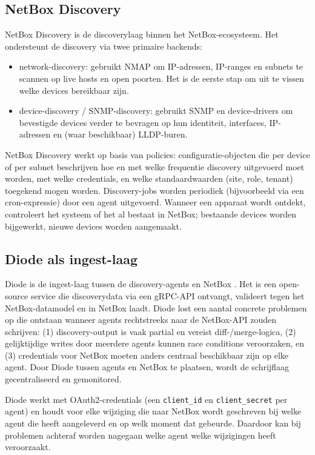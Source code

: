 \subsection{NetBox Discovery}

NetBox Discovery is de discoverylaag binnen het NetBox-ecosysteem. Het ondersteunt de discovery via twee primaire backends:\autocite{NetBoxDiscoveryDocs}

\begin{itemize}
  \item network-discovery: gebruikt NMAP om IP-adressen, IP-ranges en subnets te scannen op live hosts en open poorten. Het is de eerste stap om uit te vissen welke devices bereikbaar zijn.
  \item device-discovery / SNMP-discovery: gebruikt SNMP en device-drivers om bevestigde devices verder te bevragen op hun identiteit, interfaces, IP-adressen en (waar beschikbaar) LLDP-buren.
\end{itemize}

NetBox Discovery werkt op basis van policies: configuratie-objecten die per device of per subnet beschrijven hoe en met welke frequentie discovery uitgevoerd moet worden, met welke credentials, en welke standaardwaarden (site, role, tenant) toegekend mogen worden. Discovery-jobs worden periodiek (bijvoorbeeld via een cron-expressie) door een agent uitgevoerd. Wanneer een apparaat wordt ontdekt, controleert het systeem of het al bestaat in NetBox; bestaande devices worden bijgewerkt, nieuwe devices worden aangemaakt.

\subsection{Diode als ingest-laag}

Diode is de ingest-laag tussen de discovery-agents en NetBox \autocite{DiodeDocs,NetBoxDiodeAgent}. Het is een open-source service die discoverydata via een gRPC-API ontvangt, valideert tegen het NetBox-datamodel en in NetBox laadt. Diode lost een aantal concrete problemen op die ontstaan wanneer agents rechtstreeks naar de NetBox-API zouden schrijven: (1) discovery-output is vaak partial en vereist diff-/merge-logica, (2) gelijktijdige writes door meerdere agents kunnen race conditions veroorzaken, en (3) credentials voor NetBox moeten anders centraal beschikbaar zijn op elke agent. Door Diode tussen agents en NetBox te plaatsen, wordt de schrijflaag gecentraliseerd en gemonitored.

Diode werkt met OAuth2-credentials (een \texttt{client\_id} en \texttt{client\_secret} per agent) en houdt voor elke wijziging die naar NetBox wordt geschreven bij welke agent die heeft aangeleverd en op welk moment dat gebeurde. Daardoor kan bij problemen achteraf worden nagegaan welke agent welke wijzigingen heeft veroorzaakt.

